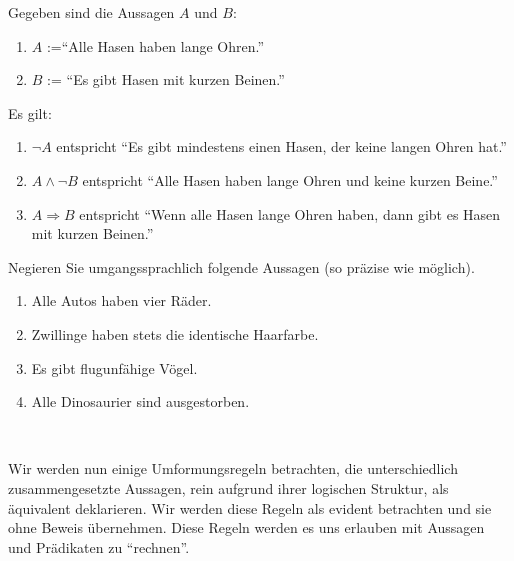 \begin{bsp}
Gegeben sind die Aussagen $A$ und $B$:
\begin{enumerate}
\item[] $A$ :=``Alle Hasen haben lange Ohren.''
\item[] $B$ := ``Es gibt Hasen mit kurzen Beinen.''
\end{enumerate}
Es gilt:
\begin{enumerate}
 \item $\neg A$ entspricht ``Es gibt mindestens einen Hasen, der keine langen Ohren hat.''
\item $A\wedge \neg B$ entspricht ``Alle Hasen haben lange Ohren und keine kurzen Beine.''
\item $A\Rightarrow B$ entspricht ``Wenn alle Hasen lange Ohren haben, dann gibt es Hasen mit kurzen Beinen.''
\end{enumerate}
\end{bsp}

\begin{ueb}
Negieren Sie umgangssprachlich folgende Aussagen (so präzise wie möglich).
\begin{enumerate}
\item Alle Autos haben vier Räder.
\item Zwillinge haben stets die identische Haarfarbe.
\item Es gibt flugunfähige Vögel.
\item Alle Dinosaurier sind ausgestorben.
\end{enumerate}
\end{ueb}
\begin{lsg}~
\end{lsg}

Wir werden nun einige Umformungsregeln betrachten, die unterschiedlich zusammengesetzte
Aussagen, rein aufgrund ihrer logischen Struktur, als äquivalent deklarieren. Wir werden diese Regeln
als evident betrachten und sie ohne Beweis übernehmen. Diese Regeln werden es uns erlauben  mit Aussagen und Prädikaten zu ``rechnen''.


